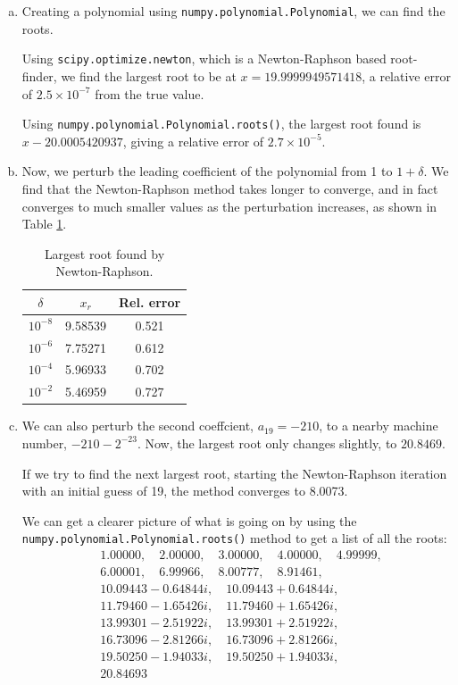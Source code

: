 \documentclass[12pt]{article}
\begin{document}
\begin{enumerate}[(a)]
\item 
Creating a polynomial using \texttt{numpy.polynomial.Polynomial}, we can find the roots.

Using \texttt{scipy.optimize.newton}, which is a Newton-Raphson based root-finder, we find the largest root to be at $x = 19.9999949571418$, a relative error of $2.5\times10^{-7}$ from the true value.

Using \texttt{numpy.polynomial.Polynomial.roots()}, the largest root found is $x - 20.0005420937$, giving a relative error of $2.7\times10^{-5}$.


\item 
Now, we perturb the leading coefficient of the polynomial from 1 to $1 + \delta$. We find that the Newton-Raphson method takes longer to converge, and in fact converges to much smaller values as the perturbation increases, as shown in Table \ref{tab:Wilkinson_perturbed}.

\begin{table}[h!]
\centering
\begin{tabular}{c|c|c}
$\delta$ 		& $x_r$ 		& Rel. error \\
\hline
$10^{-8}$	& 9.58539		& 0.521 \\
$10^{-6}$	& 7.75271		& 0.612 \\
$10^{-4}$	& 5.96933		& 0.702 \\
$10^{-2}$	& 5.46959		& 0.727 \\
\end{tabular}
\caption{Largest root found by Newton-Raphson. \label{tab:Wilkinson_perturbed}}
\end{table}


\item 
We can also perturb the second coeffcient, $a_19 = -210$, to a nearby machine number, $-210 - 2^{-23}$. Now, the largest root only changes slightly, to $20.8469$.

If we try to find the next largest root, starting the Newton-Raphson iteration with an initial guess of 19, the method converges to 8.0073.

We can get a clearer picture of what is going on by using the \texttt{numpy.polynomial.Polynomial.roots()} method to get a list of all the roots:
\begin{equation*}
\begin{aligned}
&1.00000,\quad 2.00000,\quad 3.00000,\quad 4.00000,\quad 4.99999, \\
&6.00001,\quad 6.99966,\quad 8.00777,\quad8.91461, \\
&10.09443 - 0.64844i,\quad 10.09443 + 0.64844i, \\
&11.79460 - 1.65426i,\quad 11.79460 + 1.65426i, \\
&13.99301 - 2.51922i,\quad 13.99301 + 2.51922i, \\
&16.73096 - 2.81266i,\quad 16.73096 + 2.81266i, \\
&19.50250 - 1.94033i,\quad 19.50250 + 1.94033i, \\
&20.84693	
\end{aligned}
\end{equation*}


\end{enumerate}
\end{document}
